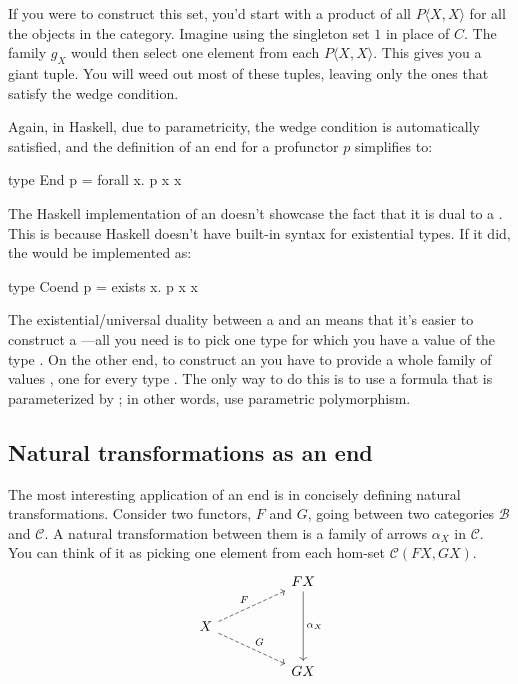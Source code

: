 \documentclass[DaoFP]{subfiles}
\begin{document}
If you were to construct this set, you'd start with a product of all $P \langle X, X \rangle$ for all the objects in the category. Imagine using the singleton set $1$ in place of $C$. The family $g_X$ would then select one element from each $P \langle X, X \rangle$. This gives you a giant tuple. You will weed out most of these tuples, leaving only the ones that satisfy the wedge condition. 

Again, in Haskell, due to parametricity, the wedge condition is automatically satisfied, and the definition of an end for a profunctor $p$ simplifies to:

\begin{haskell}
type End p = forall x. p x x
\end{haskell}

The Haskell implementation of an  doesn't showcase the fact that it is dual to a . This is because Haskell doesn't have built-in syntax for existential types. If it did, the  would be implemented as:
\begin{haskell}
type Coend p = exists x. p x x
\end{haskell}

The existential/universal duality between a  and an  means that it's easier to construct a ---all you need is to pick one type  for which you have a value of the type . On the other end, to construct an  you have to provide a whole family of values , one for every type . The only way to do this is to use a formula that is parameterized by ; in other words, use parametric polymorphism.


\subsection{Natural transformations as an end}

The most interesting application of an end is in concisely defining natural transformations. Consider two functors, $F$ and $G$, going between two categories  $\mathcal{B}$ and $\mathcal{C}$. A natural transformation between them is a family of arrows $\alpha_X$ in $\mathcal{C}$. You can think of it as picking one element from each hom-set  $\mathcal{C} (F X, G X)$.
\[
 \begin{tikzcd}
 && F X
 \arrow[dd, "\alpha_X"]
 \\
 X
 \arrow[urr, dashed, "F"]
 \arrow[drr, dashed, "G"]
 \\
 && G X
 \end{tikzcd}
\]
\end{document}
